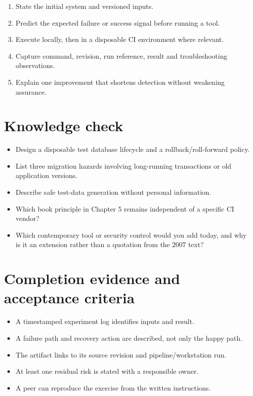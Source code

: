 \documentclass[11pt,letterpaper]{article}
\begin{document}
\begin{enumerate}
\item State the initial system and versioned inputs.
\item Predict the expected failure or success signal before running a tool.
\item Execute locally, then in a disposable CI environment where relevant.
\item Capture command, revision, run reference, result and troubleshooting observations.
\item Explain one improvement that shortens detection without weakening assurance.
\end{enumerate}
\section{Knowledge check}
\begin{itemize}
\item Design a disposable test database lifecycle and a rollback/roll-forward policy.
\item List three migration hazards involving long-running transactions or old application versions.
\item Describe safe test-data generation without personal information.
\item Which book principle in Chapter 5 remains independent of a specific CI vendor?
\item Which contemporary tool or security control would you add today, and why is it an extension rather than a quotation from the 2007 text?
\end{itemize}
\section{Completion evidence and acceptance criteria}
\begin{itemize}
\item A timestamped experiment log identifies inputs and result.
\item A failure path and recovery action are described, not only the happy path.
\item The artifact links to its source revision and pipeline/workstation run.
\item At least one residual risk is stated with a responsible owner.
\item A peer can reproduce the exercise from the written instructions.
\end{itemize}
\end{document}
